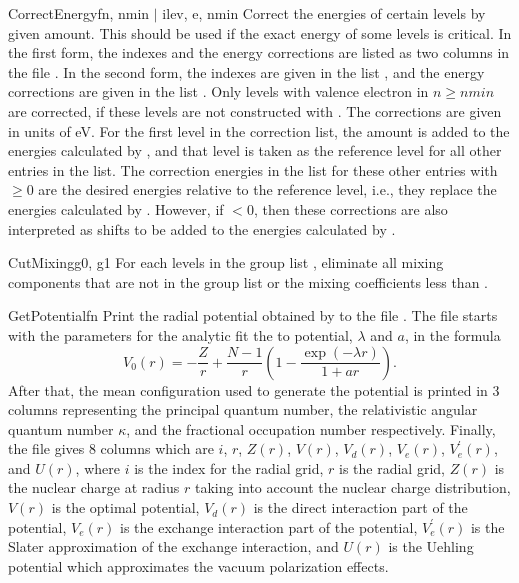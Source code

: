 \begin{fundesc}{CorrectEnergy}{fn, nmin $\mid$ ilev, e, nmin}
Correct the energies of certain levels by given amount. This should be used if
the exact energy of some levels is critical. In the first form, the indexes and
the energy corrections are listed as two columns in the file . In the
second form, the indexes are given in the list , and the energy
corrections are given in the list . Only levels with valence electron in
$n\ge nmin$ are corrected, if these levels are not constructed with
. The corrections are given in units of eV. For the first
level in the correction list, the amount is added to the energies calculated by
\cFAC, and that level is taken as the reference level for all other entries in
the list. The correction energies in the list  for these other entries
with $\ge 0$ are the desired energies relative to the reference level,
i.e., they replace the energies calculated by \cFAC. However, if $<0$,
then these corrections are also interpreted as shifts to be added to the
energies calculated by \cFAC.
\end{fundesc}

\begin{fundesc}{CutMixing}{g0, g1}
For each levels in the group list , eliminate all mixing components
that are not in the group list  or the mixing coefficients less than
.
\end{fundesc}

\begin{fundesc}{GetPotential}{fn}
Print the radial potential obtained by  to the file
. The file starts with the parameters for the analytic fit the to
potential, $\lambda$ and $a$, in the formula
\begin{equation}
V_0(r) = -\frac{Z}{r} + \frac{N-1}{r}\left(1-\frac{\exp(-\lambda
r)}{1+ar}\right).
\end{equation}
After that, the mean configuration used to generate the potential is printed
in 3 columns representing the principal quantum number, the relativistic
angular quantum number $\kappa$, and the fractional occupation number
respectively. Finally, the file gives 8 columns which are $i$, $r$, $Z(r)$,
$V(r)$, $V_d(r)$, $V_e(r)$, $V_e^\prime(r)$, and $U(r)$, where $i$ is the index
for the radial grid, $r$ is the radial grid, $Z(r)$ is the nuclear charge at
radius $r$ taking into account the nuclear charge distribution, $V(r)$ is the
optimal potential, $V_d(r)$ is the direct interaction part of the potential,
$V_e(r)$ is the exchange interaction part of the potential, $V_e^\prime(r)$ is
the Slater approximation of the exchange interaction, and $U(r)$ is the
Uehling potential which approximates the vacuum polarization effects.
\end{fundesc}

